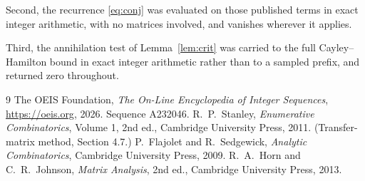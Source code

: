 \documentclass[11pt,a4paper]{article}
\theoremstyle{plain}
\theoremstyle{definition}
\begin{document}
Second, the recurrence \eqref{eq:conj} was evaluated on those published terms in exact
integer arithmetic, with no matrices involved, and vanishes wherever it applies.

Third, the annihilation test of Lemma~\ref{lem:crit} was carried to the full
Cayley--Hamilton bound in exact integer arithmetic rather than to a sampled prefix, and
returned zero throughout.

\begin{thebibliography}{9}
 The OEIS Foundation, \emph{The On-Line Encyclopedia of Integer
Sequences}, \url{https://oeis.org}, 2026. Sequence A232046.
 R.~P.~Stanley, \emph{Enumerative Combinatorics}, Volume 1, 2nd ed.,
Cambridge University Press, 2011. (Transfer-matrix method, Section 4.7.)
 P.~Flajolet and R.~Sedgewick, \emph{Analytic Combinatorics}, Cambridge
University Press, 2009.
 R.~A.~Horn and C.~R.~Johnson, \emph{Matrix Analysis}, 2nd ed., Cambridge
University Press, 2013.
\end{thebibliography}
\end{document}
